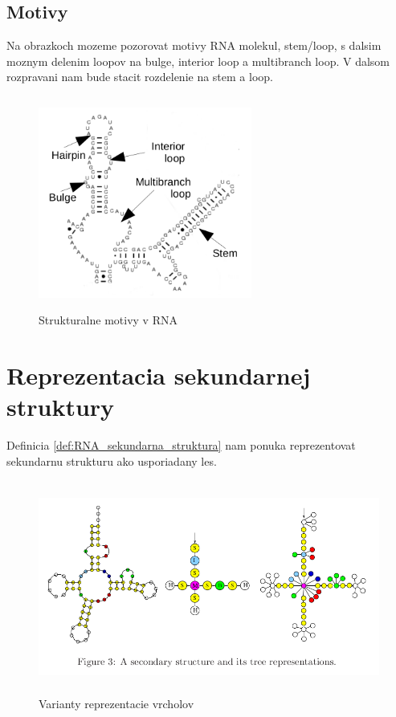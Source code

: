 \subsection{Motivy}

Na obrazkoch mozeme pozorovat motivy RNA molekul, stem/loop, s dalsim
moznym delenim loopov na bulge, interior loop a multibranch loop.
V dalsom rozpravani nam bude stacit rozdelenie na stem a loop.


\begin{figure}[H]
\centering
\includegraphics[width=70mm, height=70mm]{../img/struktury_v_rna.png}
\caption{Strukturalne motivy v RNA}
\label{obr:RNA_motifs}
\end{figure}

\section{Reprezentacia sekundarnej struktury}

Definicia \ref{def:RNA_sekundarna_struktura} nam ponuka reprezentovat sekundarnu strukturu
ako usporiadany les.

\begin{figure}[H]
\centering
\includegraphics[width=130mm, height=70mm]{../img/stromova_reprezentacia_rna.png}
\caption{Varianty reprezentacie vrcholov}
\label{obr:RNA_vrcholy}
\end{figure}

